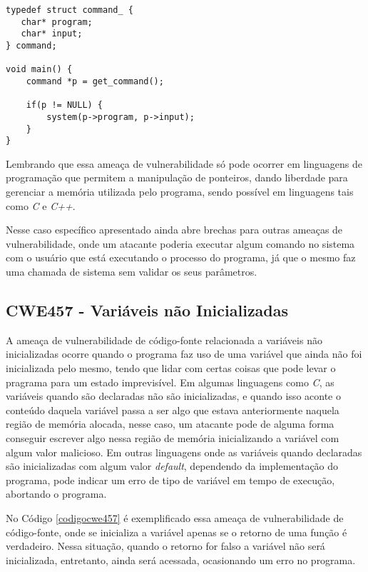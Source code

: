 \begin{lstlisting}[caption={Evitando ameaça de vulnerabilidade CWE476},
label=fixcwe476]
typedef struct command_ {
   char* program;
   char* input;
} command;

void main() {
    command *p = get_command();

    if(p != NULL) {
        system(p->program, p->input);
    }
} 
\end{lstlisting}

Lembrando que essa ameaça de vulnerabilidade só pode ocorrer em linguagens de
programação que permitem a manipulação de ponteiros, dando liberdade para
gerenciar a memória utilizada pelo programa, sendo possível em linguagens tais
como \textit{C} e \textit{C++}.

Nesse caso específico apresentado ainda abre brechas para outras ameaças de
vulnerabilidade, onde um atacante poderia executar algum comando no sistema com
o usuário que está executando o processo do programa, já que o mesmo faz uma
chamada de sistema sem validar os seus parâmetros.

\subsection{CWE457 - Variáveis não Inicializadas}\label{cwe457}

A ameaça de vulnerabilidade de código-fonte relacionada a variáveis não
inicializadas ocorre quando o programa faz uso de uma variável que ainda não foi
inicializada pelo mesmo, tendo que lidar com certas coisas que pode levar o
pragrama para um estado imprevisível. Em algumas linguagens como \textit{C}, as
variáveis quando são declaradas não são inicializadas, e
quando isso aconte o conteúdo daquela variável passa a ser algo que estava
anteriormente naquela região de memória alocada, nesse caso, um atacante pode de
alguma forma conseguir escrever algo nessa região de memória inicializando a
variável com algum valor malicioso. Em outras linguagens onde as variáveis
quando declaradas são inicializadas com algum valor \textit{default}, dependendo
da implementação do programa, pode indicar um erro de tipo de variável em tempo
de execução, abortando o programa.

No Código \ref{codigocwe457} é exemplificado essa ameaça de vulnerabilidade de
código-fonte, onde se inicializa a variável apenas se o retorno de uma função é
verdadeiro. Nessa situação, quando o retorno for falso a variável não será
inicializada, entretanto, ainda será acessada, ocasionando um erro no programa.

